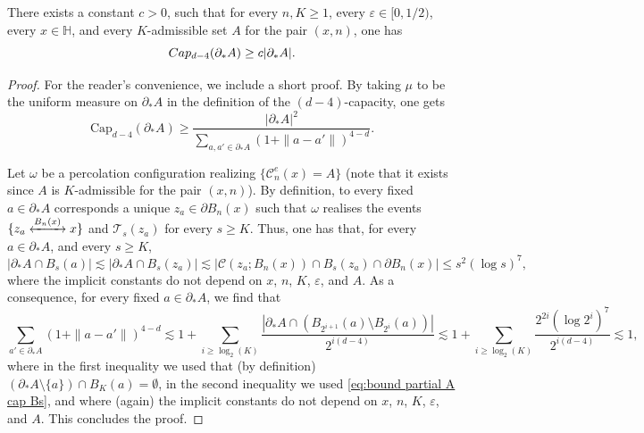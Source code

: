 \documentclass[10pt,a4paper]{amsart}
\newcommand{\connect}{\xleftrightarrow}
\begin{document}
\begin{Lem}\label{lem:lowercap}
There exists a constant $c>0$, such that for every $n,K\geq 1$, every $\varepsilon\in [0,1/2)$, every $x\in \mathbb H$, and every $K$-admissible set $A$ for the pair $(x,n)$, 
one has 
\begin{equation}
\textup{Cap}_{d-4}(\partial_*A) \ge c |\partial_*A|. 
\end{equation} 
\end{Lem}

\begin{proof}
For the reader's convenience, we include a short proof. By taking $\mu$ to be the uniform measure on $\partial_*A$ in the definition of the $(d-4)$-capacity, one gets 
\begin{equation}
\textrm{Cap}_{d-4}(\partial_*A) \ge \frac{ |\partial_*A|^2}{\sum_{a,a'\in \partial_*A} (1+\|a-a'\|)^{4-d}}. 
\end{equation}


Let $\omega$ be a percolation configuration realizing $\{\mathcal C_n^e(x)=A\}$ (note that it exists since $A$ is $K$-admissible for the pair $(x,n)$). By definition, to every fixed $a\in \partial_*A$ corresponds a unique $z_a\in \partial B_n(x)$ such that $\omega$ realises the events $\{z_a\connect{B_n(x)\:}x\}$ and $\mathcal T_{s}(z_a)$ for every $s\geq K$. Thus, one has that, for every $a\in \partial_*A$, and every $s\geq K$,
\begin{equation}\label{eq:bound partial A cap Bs}
	|\partial_*A\cap B_s(a)|\lesssim |\partial_*A\cap B_s(z_a)|\lesssim |\mathcal C(z_a;B_n(x))\cap B_s(z_a)\cap \partial B_n(x)|\leq s^2(\log s)^7,
\end{equation}
where the implicit constants do not depend on $x$, $n$, $K$, $\varepsilon$, and $A$. As a consequence, for every fixed $a\in \partial_*A$, we find that
\begin{equation} 
\sum_{a'\in \partial_*A} (1+\|a-a'\|)^{4-d} \lesssim 1+ \sum_{i\geq \log_2(K)}\frac{|\partial_*A\cap (B_{2^{i+1}}(a)\setminus B_{2^i}(a))|}{2^{i(d-4)}}\lesssim 1+\sum_{i \geq \log_2(K)}\frac{2^{2i}(\log 2^i)^7}{2^{i(d-4)}} \lesssim  1,
\end{equation}
where in the first inequality we used that (by definition) $(\partial_*A\setminus \{a\}) \cap B_{K}(a)=\emptyset$, in the second inequality we used \eqref{eq:bound partial A cap Bs}, and where (again) the implicit constants do not depend on $x$, $n$, $K$, $\varepsilon$, and $A$. This concludes the proof. 
\end{proof}   
\end{document}
